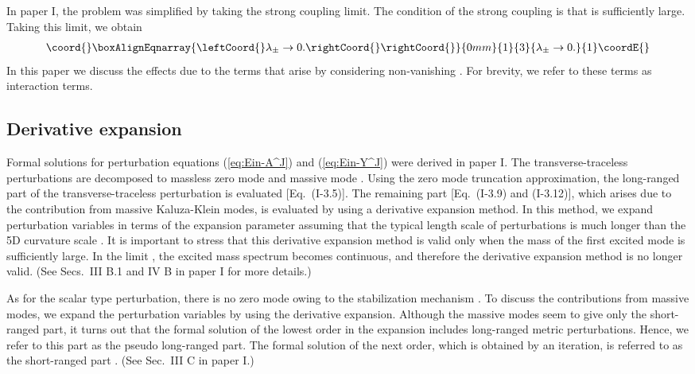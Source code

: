 \documentclass[a4paper,showpacs,preprintnumbers,amsmath,amssymb]{revtex4}
\begin{document}
In paper I, the problem was simplified by taking the strong coupling limit. 
The condition of the strong coupling is that 
\coordHE{} is sufficiently large. 
Taking this limit, we obtain 
\begin{eqnarray}\coord{}\boxAlignEqnarray{\leftCoord{}
    \lambda_{\pm} \to 0 .\rightCoord{}
\label{eq:large limit}
\rightCoord{}}{0mm}{1}{3}{
    \lambda_{\pm} \to 0 .
}{1}\coordE{}\end{eqnarray}
In this paper we discuss the effects due to the terms that arise by considering non-vanishing \myHighlight{$\lambda_\pm$}\coordHE{}.  
For brevity, we refer to these terms as interaction terms. 


\subsection{Derivative expansion}

Formal solutions for perturbation equations (\ref{eq:Ein-A^J}) and (\ref{eq:Ein-Y^J}) were derived in
paper I. 
The transverse-traceless perturbations \coordHE{} are decomposed to massless zero mode \coordHE{} and massive mode \coordHE{}.
Using the zero mode truncation approximation, the long-ranged part of the transverse-traceless perturbation \coordHE{} is evaluated [Eq.~(I-3.5)]. The remaining part \coordHE{} [Eq.~(I-3.9) and (I-3.12)], which arises due to the contribution from massive Kaluza-Klein modes, is evaluated by using a derivative expansion method.  In this method, we expand perturbation variables in terms of the expansion parameter \coordHE{} assuming that the typical length scale \coordHE{} of perturbations is much longer than the 5D curvature scale \coordHE{}. 
It is important to stress that this derivative expansion method is valid only when the mass of the first excited mode is sufficiently large. In the limit \coordHE{}, the excited mass spectrum becomes continuous, and therefore the derivative expansion method is no longer valid. 
(See Secs.~III B.1 and IV B in paper I for more details.)

 
As for the scalar type perturbation, there is no zero mode owing to the stabilization mechanism \cite{Tanaka:2000er}. 
To discuss the contributions from massive modes, we expand the perturbation variables by using the derivative expansion.  Although the massive modes seem to give only the short-ranged part, it turns out that the formal solution of the lowest order in the expansion includes long-ranged metric perturbations. Hence, we refer to this part as the pseudo long-ranged part. The formal solution of the next order, which is obtained by an iteration, is referred to as the short-ranged part \coordHE{}.  
(See Sec.~III C in paper I.)
\end{document}
